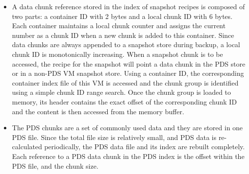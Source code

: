 \begin{itemize}
\item A data chunk reference stored in the index of snapshot recipes
is composed of two parts: a container ID with 2 bytes and a local chunk ID with 6 bytes.
Each container maintains a local  chunk counter and assigns the current number 
as a chunk ID  when  a new chunk is added to this  container. 
Since data chunks are always appended to a snapshot store during backup, 
a local chunk ID is monotonically increasing.
When a snapshot chunk is to be accessed, the recipe for the snapshot will point a data chunk
in the PDS store or in a non-PDS VM snapshot  store. 
Using  a container ID, the corresponding container index file of this VM is accessed and 
the chunk group is identified using a simple chunk ID range search. Once the chunk group is loaded to memory, 
its header contains the exact offset of the corresponding chunk ID and the content is then accessed from the memory buffer.

\item The PDS chunks are a set of commonly used data and they are stored in one PDS file.
Since the total file size is relatively small, and
PDS data is re-calculated periodically, the PDS data file and its index are rebuilt completely. 
Each reference to a PDS data chunk in the PDS index is the offset within the PDS file, and the chunk size.

\end{itemize}


 


